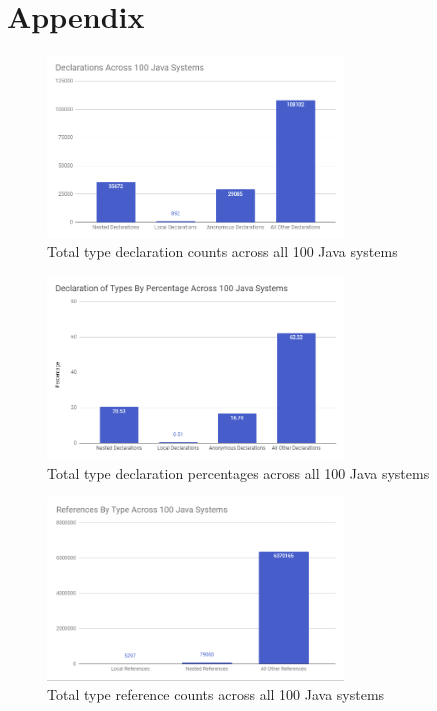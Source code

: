 \documentclass[12p]{article}
\begin{document}
\newpage

\section{Appendix}

\begin{figure}[h]
  \begin{center}
    \includegraphics[width=0.7\textwidth]{DeclarationCount.PNG}
    \caption{Total type declaration counts across all 100 Java systems}
    \label{fig:DeclarationCount}
  \end{center}
\end{figure}

\begin{figure}[h]
  \begin{center}
    \includegraphics[width=0.7\textwidth]{DeclarationPercent.PNG}
    \caption{Total type declaration percentages across all 100 Java systems}
    \label{fig:DeclarationPercent}
  \end{center}
\end{figure}

\begin{figure}[h]
  \begin{center}
    \includegraphics[width=0.7\textwidth]{ReferenceCount.PNG}
    \caption{Total type reference counts across all 100 Java systems}
    \label{fig:ReferenceCount}
  \end{center}
\end{figure}
\end{document}
